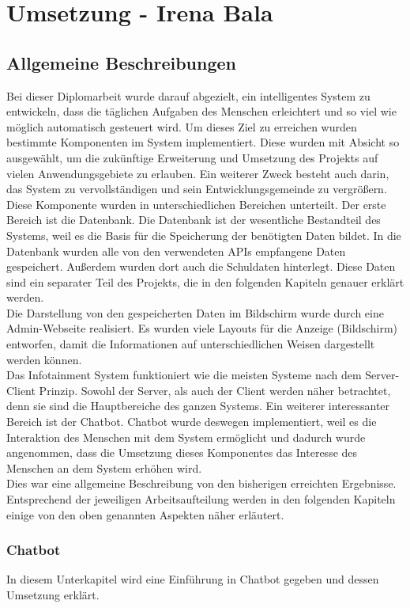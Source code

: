 \chapter{Umsetzung - Irena Bala}
\section{Allgemeine Beschreibungen}
Bei dieser Diplomarbeit wurde darauf abgezielt, ein intelligentes System zu entwickeln, dass die täglichen Aufgaben des Menschen erleichtert und so viel wie möglich automatisch gesteuert wird. Um dieses Ziel zu erreichen wurden bestimmte Komponenten im System implementiert. Diese wurden mit Absicht so ausgewählt, um die zukünftige Erweiterung und Umsetzung des Projekts auf vielen Anwendungsgebiete zu erlauben.  Ein weiterer Zweck besteht auch darin, das System zu vervollständigen und sein Entwicklungsgemeinde zu vergrößern. \\
Diese Komponente wurden in unterschiedlichen Bereichen unterteilt. Der erste Bereich ist die Datenbank. Die Datenbank ist der wesentliche Bestandteil des Systems, weil es die Basis für die Speicherung der benötigten Daten bildet. In die Datenbank wurden alle von den verwendeten APIs empfangene Daten gespeichert. Außerdem wurden dort auch die Schuldaten hinterlegt. Diese Daten sind ein separater Teil des Projekts, die in den folgenden Kapiteln genauer erklärt werden. \\
Die Darstellung von den gespeicherten Daten im Bildschirm wurde durch eine Admin-Webseite realisiert. Es wurden viele Layouts für die Anzeige (Bildschirm) entworfen, damit die Informationen auf unterschiedlichen Weisen dargestellt werden können. \\
Das Infotainment System funktioniert wie die meisten Systeme nach dem Server- Client Prinzip. Sowohl der Server, als auch der Client werden näher betrachtet, denn sie sind die Hauptbereiche des ganzen Systems. 
Ein weiterer interessanter Bereich ist der Chatbot. Chatbot wurde deswegen implementiert, weil es die Interaktion des Menschen mit dem System ermöglicht und dadurch wurde angenommen, dass die Umsetzung dieses Komponentes das Interesse des Menschen an dem System erhöhen wird. \\
Dies war eine allgemeine Beschreibung von den bisherigen erreichten Ergebnisse. Entsprechend der jeweiligen Arbeitsaufteilung werden in den folgenden Kapiteln einige von den oben genannten Aspekten näher erläutert. \\
\subsection{Chatbot} 
In diesem Unterkapitel wird eine Einführung in Chatbot gegeben und dessen Umsetzung erklärt.
